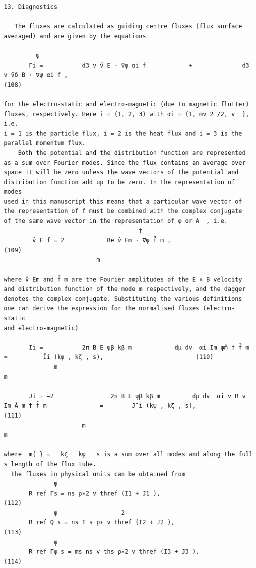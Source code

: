 \documentclass[a4paper]{article}
\newcommand{\gkwpagefont}{\fontsize{6.0pt}{7.55pt}\selectfont}
\begin{document}
\begin{Verbatim}[fontsize=\gkwpagefont]
13. Diagnostics

   The fluxes are calculated as guiding centre fluxes (flux surface averaged) and are given by the equations
                                                               
         ψ
       Γi =           d3 v ṽ E · ∇ψ αi f            +              d3 v ṽδ B · ∇ψ αi f ,                                                   (108)

for the electro-static and electro-magnetic (due to magnetic flutter) fluxes, respectively. Here i = (1, 2, 3) with αi = (1, mv 2 /2, v  ), i.e.
i = 1 is the particle flux, i = 2 is the heat flux and i = 3 is the parallel momentum flux.
    Both the potential and the distribution function are represented as a sum over Fourier modes. Since the flux contains an average over
space it will be zero unless the wave vectors of the potential and distribution function add up to be zero. In the representation of modes
used in this manuscript this means that a particular wave vector of the representation of f must be combined with the complex conjugate
of the same wave vector in the representation of φ or A  , i.e.
                                      †                    
        v̂ E f = 2            Re v̂ Em · ∇ψ f̂ m ,                                                                                           (109)
                          m

where v̂ Em and f̂ m are the Fourier amplitudes of the E × B velocity and distribution function of the mode m respectively, and the dagger
denotes the complex conjugate. Substituting the various definitions one can derive the expression for the normalised fluxes (electro-static
and electro-magnetic)
                                            
       Ii =           2π B E ψβ kβ m            dμ dv  αi Im φ̂m † f̂ m              =          Īi (kψ , kζ , s),                          (110)
              m                                                                              m
                                                 
       Ji = −2                2π B E ψβ kβ m         dμ dv  αi v R v  Im Â m † f̂ m               =        J¯i (kψ , kζ , s),            (111)
                      m                                                                                    m
                                   
where  m{ } =   kζ   kψ   s is a sum over all modes and along the full s length of the flux tube.
  The fluxes in physical units can be obtained from
              ψ
       R ref Γs = ns ρ∗2 v thref (I1 + J1 ),                                                                                                 (112)
              ψ                  2
       R ref Q s = ns T s ρ∗ v thref (I2 + J2 ),                                                                                             (113)
              ψ
       R ref Γφ s = ms ns v ths ρ∗2 v thref (I3 + J3 ).                                                                                      (114)


\end{Verbatim}
\end{document}
